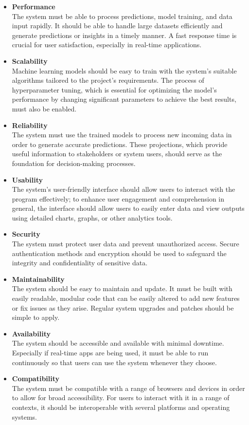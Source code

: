 \begin{itemize}
    \item \textbf{Performance} \\
 The system must be able to process predictions, model training, and data input rapidly. It should be able to handle large datasets efficiently and generate predictions or insights in a timely manner. A fast response time is crucial for user satisfaction, especially in real-time applications.
    
    \item \textbf{Scalability} \\
Machine learning models should be easy to train with the system's suitable algorithms tailored to the project's requirements. The process of hyperparameter tuning, which is essential for optimizing the model's performance by changing significant parameters to achieve the best results, must also be enabled.

    \item \textbf{Reliability} \\
The system must use the trained models to process new incoming data in order to generate accurate predictions. These projections, which provide useful information to stakeholders or system users, should serve as the foundation for decision-making processes.
    \item \textbf{Usability} \\
The system's user-friendly interface should allow users to interact with the program effectively; to enhance user engagement and comprehension in general, the interface should allow users to easily enter data and view outputs using detailed charts, graphs, or other analytics tools.

   \item \textbf{Security} \\
The system must protect user data and prevent unauthorized access. Secure authentication methods and encryption should be used to safeguard the integrity and confidentiality of sensitive data.

   \item \textbf{Maintainability} \\
The system should be easy to maintain and update. It must be built with easily readable, modular code that can be easily altered to add new features or fix issues as they arise. Regular system upgrades and patches should be simple to apply.

   \item \textbf{Availability} \\
The system should be accessible and available with minimal downtime. Especially if real-time apps are being used, it must be able to run continuously so that users can use the system whenever they choose.

  \item \textbf{Compatibility} \\
The system must be compatible with a range of browsers and devices in order to allow for broad accessibility. For users to interact with it in a range of contexts, it should be interoperable with several platforms and operating systems.
\end{itemize}
